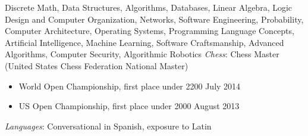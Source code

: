 \documentclass[11pt]{article}
\begin{document}
\begin{adjustwidth}{-2.2cm}{-2.2cm}
    \eosec
    Discrete Math, Data Structures, Algorithms, Databases, Linear Algebra, Logic Design and Computer Organization, Networks, Software Engineering, Probability, Computer Architecture, Operating Systems, Programming Language Concepts, Artificial Intelligence, Machine Learning, Software Craftsmanship, Advanced Algorithms, Computer Security, Algorithmic Robotics
    \eosec
    \emph{Chess}: Chess Master (United States Chess Federation National Master)
    \begin{itemize}[nosep]
        \item World Open Championship, first place under 2200 \hfill July 2014
        \item US Open Championship, first place under 2000 \hfill August 2013
    \end{itemize}
    \emph{Languages}: Conversational in Spanish, exposure to Latin
\end{adjustwidth}
\end{document}

